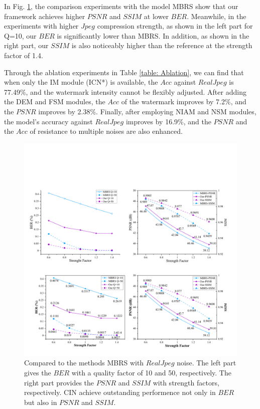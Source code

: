 \documentclass[sigconf]{acmart}
\begin{document}
In Fig. \ref{fig: compare2sota}, the comparison experiments with the model MBRS show that our framework achieves higher $PSNR$ and $SSIM$ at lower $BER$. Meanwhile, in the experiments with higher $Jpeg$ compression strength, as shown in the left part for Q=10, our $BER$ is significantly lower than MBRS. In addition, as shown in the right part, our $SSIM$ is also noticeably higher than the reference at the strength factor of 1.4.

Through the ablation experiments in Table \ref{table: Ablation}, we can find that when only the IM module (ICN*) is available, the $Acc$ against $RealJpeg$ is 77.49\%, and the watermark intensity cannot be flexibly adjusted. After adding the DEM and FSM modules, the $Acc$ of the watermark improves by 7.2\%, and  the $PSNR$ improves by 2.38\%. Finally, after employing NIAM and NSM modules, the model's accuracy against $RealJpeg$ improves by 16.9\%, and the $PSNR$ and the $Acc$ of resistance to multiple noises are also enhanced.







\begin{figure}[t]
	\centering
	\includegraphics[width=1.0\linewidth]{picture/compare2sota.pdf}
	\caption{
		Compared to the methods MBRS with $RealJpeg$ noise. The left part gives the $BER$ with a quality factor of 10 and 50, respectively. The right part provides the $PSNR$ and $SSIM$ with strength factors, respectively.  CIN achieve outstanding performence not only in $BER$ but also in $PSNR$ and $SSIM$.
	}
	\label{fig: compare2sota}
\end{figure}
\end{document}

